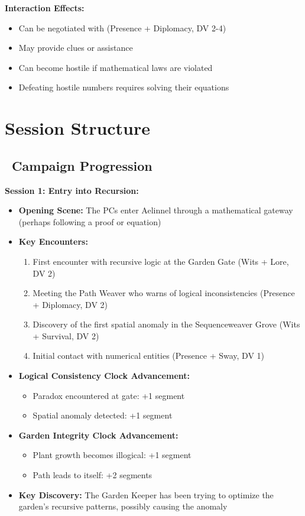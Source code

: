 \documentclass[11pt]{article}
\begin{document}
\textbf{Interaction Effects:}
\begin{itemize}
    \item Can be negotiated with (Presence + Diplomacy, DV 2-4)
    \item May provide clues or assistance
    \item Can become hostile if mathematical laws are violated
    \item Defeating hostile numbers requires solving their equations
\end{itemize}

\section{Session Structure}

\subsection*{\faBook\ Campaign Progression}

\textbf{Session 1: Entry into Recursion:}
\begin{itemize}
    \item \textbf{Opening Scene:} The PCs enter Aelinnel through a mathematical gateway (perhaps following a proof or equation)
    \item \textbf{Key Encounters:}
    \begin{enumerate}
        \item First encounter with recursive logic at the Garden Gate (Wits + Lore, DV 2)
        \item Meeting the Path Weaver who warns of logical inconsistencies (Presence + Diplomacy, DV 2)
        \item Discovery of the first spatial anomaly in the Sequenceweaver Grove (Wits + Survival, DV 2)
        \item Initial contact with numerical entities (Presence + Sway, DV 1)
    \end{enumerate}
    \item \textbf{Logical Consistency Clock Advancement:}
    \begin{itemize}
        \item Paradox encountered at gate: +1 segment
        \item Spatial anomaly detected: +1 segment
    \end{itemize}
    \item \textbf{Garden Integrity Clock Advancement:}
    \begin{itemize}
        \item Plant growth becomes illogical: +1 segment
        \item Path leads to itself: +2 segments
    \end{itemize}
    \item \textbf{Key Discovery:} The Garden Keeper has been trying to optimize the garden's recursive patterns, possibly causing the anomaly
\end{itemize}
\end{document}
